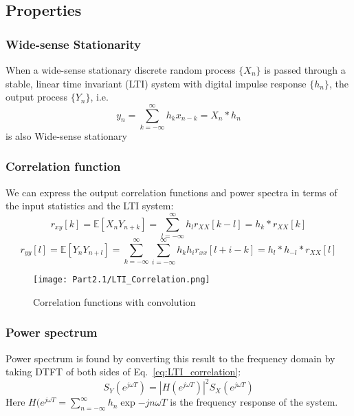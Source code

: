 \documentclass[12pt]{article}
\newcommand{\mexp}{\mathbb{E}}
\newcommand{\summ}[2]{\sum_{#1}^{#2}}
\newcommand{\sumkinfinf}{\summ{k=-\infty}{\infty}}
\newcommand{\sumninfinf}{\summ{n=-\infty}{\infty}}
\newcommand{\sumiinfinf}{\summ{i=-\infty}{\infty}}
\newcommand{\proc}[1]{\{ #1_n\}}
\newcommand{\autocox}{r_{xx}}
\newcommand{\autocoy}{r_{yy}}
\newcommand{\crosscoxy}{r_{xy}}
\begin{document}
\subsection{Properties}
\subsubsection{Wide-sense Stationarity}

When a wide-sense stationary discrete random process $\proc{X}$ is passed through a stable, linear time invariant (LTI) system with digital impulse response $\proc{h}$, the output process $\proc{Y}$, i.e.
    \[
    y_n = \sumkinfinf h_k x_{n-k} = X_n * h_n
    \]
    is also Wide-sense stationary

\subsubsection{Correlation function}

We can express the output correlation functions and power spectra in terms of the input statistics and the LTI system:
    \[
    \crosscoxy[k] =\mexp[X_n Y_{n+k}] = \sum_{l=-\infty}^{\infty}h_l r_{XX}[k-l] = h_k * r_{XX}[k]
    \]
    \begin{equation}
        \autocoy[l] = \mexp[Y_n Y_{n+l}] = \sumkinfinf\sumiinfinf h_k h_i \autocox[l+ i-k] = h_l * h_{-l} * r_{XX}[l]
        \label{eq:LTI_correlation}
    \end{equation}
    
\begin{figure}[H]
    \centering
    \texttt{[image: Part2.1/LTI\_Correlation.png]}
    \caption{Correlation functions with convolution}
\end{figure}
\subsubsection{Power spectrum}
Power spectrum is found by converting this result to the frequency domain by taking DTFT of both sides of Eq.~\ref{eq:LTI_correlation}:
\begin{equation}
    S_Y(e^{j\omega T}) = |H(e^{j\omega T})|^2 S_X(e^{j\omega T})
\end{equation}
Here $H(e^{j\omega T} = \sumninfinf h_n \exp{-jn\omega T}$ is the frequency response of the system.
\end{document}
